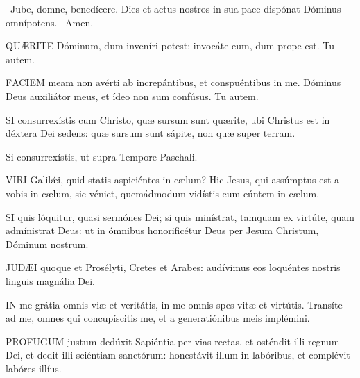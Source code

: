 \V\ Jube, domne, benedícere.  Dies et actus nostros in sua pace dispónat Dóminus omnípotens. \R\ Amen.


\lettrine[lines=2]{Q}{UÆRITE} Dóminum, dum inveníri potest: invocáte eum, dum prope est. Tu autem.


\lettrine[lines=2]{F}{ACIEM} meam non avérti ab increpántibus, et conspuéntibus in me. Dóminus Deus auxiliátor meus, et ídeo non sum confúsus. Tu autem.


\lettrine[lines=2]{S}{I} consurrexístis cum Christo, quæ sursum sunt quærite, ubi Christus est in déxtera Dei sedens: quæ sursum sunt sápite, non quæ super terram.


 Si consurrexístis, ut supra Tempore Paschali.


\lettrine[lines=2]{V}{IRI} Galilǽi, quid statis aspiciéntes in cælum? Hic Jesus, qui assúmptus est a vobis in cælum, sic véniet, quemádmodum vidístis eum eúntem in cælum.


\lettrine[lines=2]{S}{I} quis lóquitur, quasi sermónes Dei; si quis minístrat, tamquam ex virtúte, quam admínistrat Deus: ut in ómnibus honorificétur Deus per Jesum Christum, Dóminum nostrum.


\lettrine[lines=2]{J}{UDÆI} quoque et Prosélyti, Cretes et Arabes: audívimus eos loquéntes nostris linguis magnália Dei.



\lettrine[lines=2]{I}{N} me grátia omnis viæ et veritátis, in me omnis spes vitæ et virtútis. Transíte ad me, omnes qui concupíscitis me, et a generatiónibus meis implémini.


\lettrine[lines=2]{P}{ROFUGUM} justum dedúxit Sapiéntia per vias rectas, et osténdit illi regnum Dei, et dedit illi sciéntiam sanctórum: honestávit illum in labóribus, et complévit labóres illíus.

